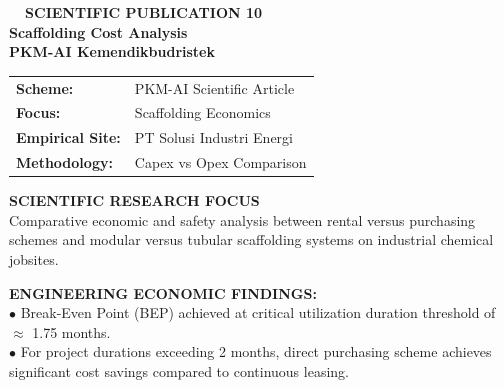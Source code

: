 \documentclass[10pt,a4paper,landscape]{article}
\begin{document}
\noindent
\begin{minipage}[t]{0.30\linewidth}
  \vspace{0pt}
  \begin{tcolorbox}[sharp corners, boxrule=0.8pt, colframe=pborder, colback=white, left=3mm, right=3mm, top=2.5mm, bottom=2.5mm, height=100mm]
    \colorbox{pred}{\fontsize{7pt}{8pt}\selectfont\bfseries\color{white}\ \ SCIENTIFIC PUBLICATION 10\ \ }\\[1.5mm]
    {\fontsize{9.5pt}{11.5pt}\selectfont\bfseries\color{pnavy}Scaffolding Cost Analysis}\\[0.5mm]
    {\fontsize{7pt}{8.5pt}\selectfont\bfseries\color{pred}PKM-AI Kemendikbudristek}\\[2mm]

    \begin{tcolorbox}[sharp corners, boxrule=0.5pt, colframe=pborder, colback=pbglight, left=2mm, right=2mm, top=1.5mm, bottom=1.5mm]
      \begin{tabularx}{\linewidth}{@{}p{22mm} X@{}}
        {\fontsize{6.8pt}{8pt}\selectfont\bfseries Scheme:} & {\fontsize{6.8pt}{8pt}\selectfont PKM-AI Scientific Article} \\[0.8mm]
        {\fontsize{6.8pt}{8pt}\selectfont\bfseries Focus:} & {\fontsize{6.8pt}{8pt}\selectfont Scaffolding Economics} \\[0.8mm]
        {\fontsize{6.8pt}{8pt}\selectfont\bfseries Empirical Site:} & {\fontsize{6.8pt}{8pt}\selectfont PT Solusi Industri Energi} \\[0.8mm]
        {\fontsize{6.8pt}{8pt}\selectfont\bfseries Methodology:} & {\fontsize{6.8pt}{8pt}\selectfont Capex vs Opex Comparison}
      \end{tabularx}
    \end{tcolorbox}
    \vspace{1.5mm}

    {\fontsize{7.5pt}{9pt}\selectfont\bfseries\color{pnavy}SCIENTIFIC RESEARCH FOCUS}\\[0.8mm]
    {\fontsize{6.5pt}{8.2pt}\selectfont\color{psteel}
    Comparative economic and safety analysis between rental versus purchasing schemes and modular versus tubular scaffolding systems on industrial chemical jobsites.
    }
  \end{tcolorbox}
  \vspace{2mm}

  \begin{tcolorbox}[sharp corners, boxrule=0.6pt, colframe=pnavy, colback=pbglight, left=2.5mm, right=2.5mm, top=2mm, bottom=2mm, height=52mm]
    {\fontsize{7pt}{8.5pt}\selectfont\bfseries\color{pnavy}ENGINEERING ECONOMIC FINDINGS:}\\[1.5mm]
    {\fontsize{6.5pt}{8.2pt}\selectfont\color{psteel}
    $\bullet$ Break-Even Point (BEP) achieved at critical utilization duration threshold of $\approx$ 1.75 months.\\
    $\bullet$ For project durations exceeding 2 months, direct purchasing scheme achieves significant cost savings compared to continuous leasing.
    }
  \end{tcolorbox}
\end{minipage}%
\end{document}
